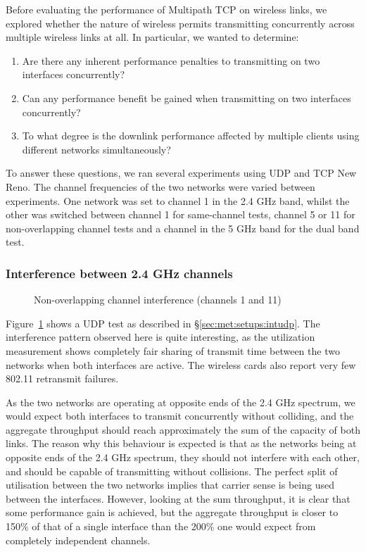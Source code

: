 Before evaluating the performance of Multipath TCP on wireless links, we
explored whether the nature of wireless permits transmitting
concurrently across multiple wireless links at all. In particular, we wanted
to determine:

\begin{enumerate}
  \item Are there any inherent performance penalties to transmitting on two
    interfaces concurrently?
  \item Can any performance benefit be gained when transmitting on two
    interfaces concurrently?
  \item To what degree is the downlink performance affected by multiple clients
    using different networks simultaneously?
\end{enumerate}

To answer these questions, we ran several experiments using UDP and TCP New 
Reno.
The channel frequencies of the two networks were varied between experiments. One
network was set to channel 1 in the 2.4 GHz band, whilst the other
was switched between channel 1 for same-channel tests, channel 5 or 11 for
non-overlapping channel tests and a channel in the 5 GHz band for the dual band 
test. 

\subsubsection{Interference between 2.4 GHz channels}

\begin{figure}[h]
 \centering
 
 \caption{Non-overlapping channel interference (channels 1 and 11)}\label{graph:cc-interference}
\end{figure}

Figure~\ref{graph:cc-interference} shows a UDP test as described in 
\S\ref{sec:met:setups:intudp}.
The interference pattern observed here is quite interesting, as the
utilization measurement shows completely fair sharing of transmit time
between the two networks when both interfaces are active. The
wireless cards also report very few 802.11 retransmit failures.

As the two networks are operating at opposite ends of the 2.4 GHz spectrum, we
would expect both interfaces to transmit concurrently without colliding,
and the aggregate throughput should reach approximately the sum of the capacity of
both links. The reason why this behaviour is expected is that as the networks being at opposite ends of the 2.4 GHz spectrum, they should not interfere with each other, and
should be capable of transmitting without collisions. The perfect split of utilisation between the two networks implies that carrier sense is being used between the interfaces.
However, looking at the sum throughput, it is clear that some performance gain is
achieved, but the aggregate throughput is closer to 150\% of that of a single
interface than the 200\% one would expect from completely independent channels.

